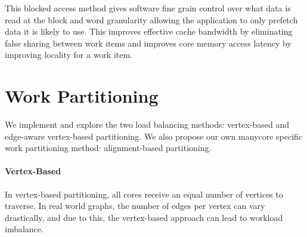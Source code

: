 This blocked access method gives software fine grain control over what data is read at the block and word granularity allowing the application to only prefetch data it is likely to use. 
This improves effective cache bandwidth by eliminating false sharing between work items and improves core memory access latency by improving locality for a work item.



\section{Work Partitioning} \label{sec:method:sub:edge-aware-partitioning}


We implement and explore the two load balancing methods: vertex-based and edge-aware vertex-based partitioning. We also propose our own manycore specific work partitioning method: alignment-based partitioning. 

\paragraph{Vertex-Based} In vertex-based partitioning, all cores receive an equal number of vertices to traverse. 
In real world graphs, the number of edges per vertex can vary drastically, and due to this, the vertex-based approach can lead to workload imbalance. 

